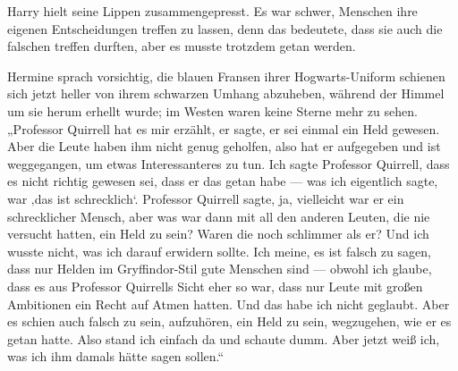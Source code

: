 Harry hielt seine Lippen zusammengepresst. Es war schwer, Menschen ihre eigenen Entscheidungen treffen zu lassen, denn das bedeutete, dass sie auch die falschen treffen durften, aber es musste trotzdem getan werden.

Hermine sprach vorsichtig, die blauen Fransen ihrer Hogwarts-Uniform schienen sich jetzt heller von ihrem schwarzen Umhang abzuheben, während der Himmel um sie herum erhellt wurde; im Westen waren keine Sterne mehr zu sehen.
„Professor Quirrell hat es mir erzählt, er sagte, er sei einmal ein Held gewesen. Aber die Leute haben ihm nicht genug geholfen, also hat er aufgegeben und ist weggegangen, um etwas Interessanteres zu tun. Ich sagte Professor Quirrell, dass es nicht richtig gewesen sei, dass er das getan habe — was ich eigentlich sagte, war ‚das ist schrecklich‘. Professor Quirrell sagte, ja, vielleicht war er ein schrecklicher Mensch, aber was war dann mit all den anderen Leuten, die nie versucht hatten, ein Held zu sein? Waren die noch schlimmer als er? Und ich wusste nicht, was ich darauf erwidern sollte. Ich meine, es ist falsch zu sagen, dass nur Helden im Gryffindor-Stil gute Menschen sind — obwohl ich glaube, dass es aus Professor Quirrells Sicht eher so war, dass nur Leute mit großen Ambitionen ein Recht auf Atmen hatten. Und das habe ich nicht geglaubt. Aber es schien auch falsch zu sein, aufzuhören, ein Held zu sein, wegzugehen, wie er es getan hatte. Also stand ich einfach da und schaute dumm. Aber jetzt weiß ich, was ich ihm damals hätte sagen sollen.“

